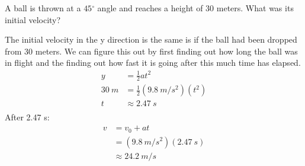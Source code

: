 \documentclass[fleqn,addpoints]{exam}
\newcommand{\degree}{\ensuremath{^\circ}}
\begin{document}
\begin{questions}

\question[5]
A ball is thrown at a $45 \degree$ angle and reaches a height of 30 meters.  What was its initial velocity?

\begin{solution}
The initial velocity in the y direction is the same is if the ball had been dropped from 30 meters.  We can figure this
out by first finding out how long the ball was in flight and the finding out how fast it is going after this much time
has elapsed.
\begin{align*}
  y &= \frac{1}{2} at^2 \\
  30 \ m &= \frac{1}{2} (9.8 \ m/s^2)(t^2) \\
  t & \approx 2.47 \ s \\
\end{align*}
After 2.47 s:
\begin{align*}
  v &= v_0 + at \\
   &= (9.8 \ m/s^2)(2.47 \ s) \\
  &\approx 24.2 \ m/s \\
\end{align*}


\end{solution}
\end{questions}
\end{document}
